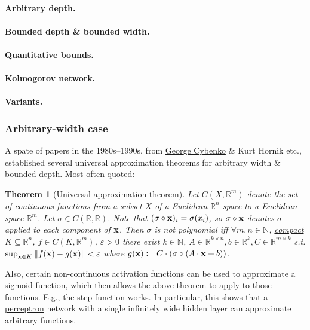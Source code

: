 \documentclass{article}
\newtheorem{theorem}{Theorem}
\begin{document}
\paragraph{Arbitrary depth.}

\paragraph{Bounded depth \& bounded width.}

\paragraph{Quantitative bounds.}

\paragraph{Kolmogorov network.}

\paragraph{Variants.}

\subsubsection{Arbitrary-width case}
A spate of papers in the 1980s--1990s, from \href{https://en.wikipedia.org/wiki/George_Cybenko}{George Cybenko} \& Kurt Hornik etc., established several universal approximation theorems for arbitrary width \& bounded depth. Most often quoted:

\begin{theorem}[Universal approximation theorem]
	Let $C(X,\mathbb{R}^m)$ denote the set of \href{https://en.wikipedia.org/wiki/Continuous_functions}{continuous functions} from a subset $X$ of a Euclidean $\mathbb{R}^n$ space to a Euclidean space $\mathbb{R}^m$. Let $\sigma\in C(\mathbb{R},\mathbb{R})$. Note that $(\sigma\circ{\bf x})_i = \sigma(x_i)$, so $\sigma\circ{\bf x}$ denotes $\sigma$ applied to each component of ${\bf x}$. Then $\sigma$ is not polynomial iff $\forall m,n\in\mathbb{N}$, \href{https://en.wikipedia.org/wiki/Compact_subspace}{compact} $K\subseteq\mathbb{R}^n$, $f\in C(K,\mathbb{R}^m)$, $\varepsilon > 0$ there exist $k\in\mathbb{N}$, $A\in\mathbb{R}^{k\times n},b\in\mathbb{R}^k,C\in\mathbb{R}^{m\times k}$ s.t. $\sup_{{\bf x}\in K} \|f({\bf x}) - g({\bf x})\| < \varepsilon$ where $g({\bf x})\coloneqq C\cdot(\sigma\circ(A\cdot{\bf x} + b))$.
\end{theorem}
Also, certain non-continuous activation functions can be used to approximate a sigmoid function, which then allows the above theorem to apply to those functions. E.g., the \href{https://en.wikipedia.org/wiki/Step_function}{step function} works. In particular, this shows that a \href{https://en.wikipedia.org/wiki/Perceptron}{perceptron} network with a single infinitely wide hidden layer can approximate arbitrary functions.
\end{document}

